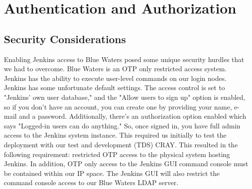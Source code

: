 \documentclass[10pt, conference, compsocconf]{IEEEtran}
\begin{document}



\section{Authentication and Authorization}
\label{sec:AuthenticationAuthorization}

\subsection{Security Considerations}
Enabling Jenkins access to Blue Waters posed some unique security hurdles that we had to overcome. Blue Waters is an OTP only restricted access system. Jenkins has the ability to execute user-level commands on our login nodes. Jenkins has some unfortunate default settings. The access control is set to "Jenkins' own user database," and the "Allow users to sign up" option is enabled, so if you don't have an account, you can create one by providing your name, e-mail and a password. Additionally, there's an authorization option enabled which says "Logged-in users can do anything." So, once signed in, you have full admin access to the Jenkins system instance.  This required us initially to test the deployment with our test and development (TDS) CRAY. This resulted in the following requirement: restricted OTP access to the physical system hosting Jenkins. In addition, OTP only access to the Jenkins GUI command console must be contained within our IP space.  The Jenkins GUI will also restrict the command console access to our Blue Waters LDAP server. 
\end{document}
